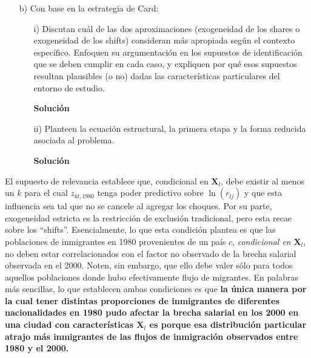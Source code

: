 \documentclass[a4paper, answers, addpoints, 11pt]{exam}
\newenvironment{solucion}{%
  \begin{mdframed}[
    backgroundcolor=blue!5,    %
    linecolor=blue!50,          %
    linewidth=2pt,              %
    leftmargin=10pt,            %
    rightmargin=8pt,           %
    topline=true,              %
    bottomline=true,            %
    roundcorner=10pt,           %
    innerleftmargin=10pt,       %
    innerrightmargin=10pt,      %
    innerbottommargin=10pt,     %
    innertopmargin=10pt         %
  ]%
  \begin{tcolorbox}[colframe=blue!50!black, colback=blue!50, coltitle=white, sharp corners=all, boxrule=1mm, width=\textwidth, halign=left, valign=center, top=0mm, bottom=0mm, left=0mm, right=0mm] \textbf{Solución} \end{tcolorbox} }{\end{mdframed}}
\begin{document}
\begin{itemize}

   

    \item[b)] Con base en la estrategia de Card:
    
    
     \begin{itemize}
         \item[i)] Discutan cuál de las dos aproximaciones (exogeneidad de los shares o exogeneidad de los shifts) consideran más apropiada según el contexto específico. Enfoquen su argumentación en los supuestos de identificación que se deben cumplir en cada caso, y expliquen por qué esos supuestos resultan plausibles (o no) dadas las características particulares del entorno de estudio. \\
        
         \begin{solucion}
\end{solucion}
           \item[ii)] Planteen la ecuación estructural, la primera etapa y la forma reducida asociada al problema.\\ 
         \begin{solucion}
\end{solucion}
     \end{itemize}
     
     

\end{itemize}   


El supuesto de relevancia establece que, condicional en $\boldsymbol{X}_l$, debe existir al menos un $k$ para el cual $z_{kl, 1980}$ tenga poder predictivo sobre $\ln(r_{lj})$ y que esta influencia sea tal que no se cancele al agregar los choques. Por su parte, exogeneidad estricta es la restricción de exclusión tradicional, pero esta recae sobre los ``shifts''. Esencialmente, lo que esta condición plantea es que las poblaciones de inmigrantes en 1980 provenientes de un país $c$, \textit{condicional en } $\boldsymbol{X}_l$, no deben estar correlacionados con el factor no observado de la brecha salarial observada en el 2000. Noten, sin embargo, que ello debe valer sólo para todos aquellos poblaciones donde hubo  efectivamente flujo de migrantes. En palabras más sencillas, lo que establecen ambas condiciones es que \textbf{la única manera por la cual tener distintas proporciones de inmigrantes de diferentes nacionalidades en 1980 pudo afectar la brecha salarial en los 2000 en una ciudad con características $\boldsymbol{X}_l$ es porque esa distribución particular atrajo más inmigrantes de las flujos de inmigración observados entre 1980 y el 2000.}
\end{document}
